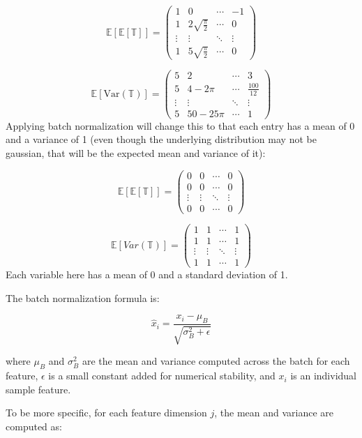 \documentclass[12pt]{article}
\begin{document}
\[\mathbb{E}[\mathbb{E}[\mathbb{T}]] =  \begin{pmatrix}
1 & 0  & \cdots & -1 \\
1  & 2 \sqrt{\frac{\pi}{2}} & \cdots  & 0 \\
\vdots & \vdots & \ddots & \vdots \\
1 & 5\sqrt{\frac{\pi}{2}}  & \cdots & 0 
\end{pmatrix}\]

\[ 
\mathbb{E}[\text{Var}(\mathbb{T})] = \begin{pmatrix}
5 & 2 & \cdots & 3 \\
5 & 4 - 2\pi & \cdots & \frac{100}{12} \\
\vdots & \vdots & \ddots & \vdots \\
5 & 50 - 25\pi & \cdots & 1 
\end{pmatrix}
\]
Applying batch normalization will change this to that each entry has a mean of 0 and a variance of 1 (even though the underlying distribution may not be gaussian, that will be the expected mean and variance of it):

\[\mathbb{E}[\mathbb{E}[\mathbb{T}]] =  \begin{pmatrix}
0 & 0  & \cdots & 0 \\
0  & 0 & \cdots  & 0 \\
\vdots & \vdots & \ddots & \vdots \\
0 & 0  & \cdots & 0 
\end{pmatrix}\]

\[\mathbb{E}[Var(\mathbb{T})] =  \begin{pmatrix}
1 & 1  & \cdots & 1 \\
1  & 1 & \cdots  & 1 \\
\vdots & \vdots & \ddots & \vdots \\
1 & 1  & \cdots & 1 
\end{pmatrix}\]
Each variable here has a mean of 0 and a standard deviation of 1. 

The batch normalization formula is:

\[ \hat{x}_i = \frac{x_i - \mu_B}{\sqrt{\sigma_B^2 + \epsilon}} \]

where \( \mu_B \) and \( \sigma_B^2 \) are the mean and variance computed across the batch for each feature, \( \epsilon \) is a small constant added for numerical stability, and \( x_i \) is an individual sample feature.

To be more specific, for each feature dimension \( j \), the mean and variance are computed as:
\end{document}
